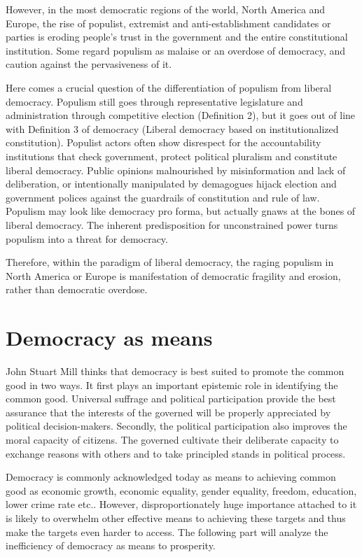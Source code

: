 \documentclass{scrartcl}
\begin{document}
However, in the most democratic regions of the world, North America
and Europe, the rise of populist, extremist and anti-establishment
candidates or parties is eroding people's trust in the government
and the entire constitutional institution. Some regard populism as
malaise or an overdose of democracy, and caution against the pervasiveness
of it.

Here comes a crucial question of the differentiation of populism from
liberal democracy. Populism still goes through representative legislature
and administration through competitive election (Definition 2), but
it goes out of line with Definition 3 of democracy (Liberal democracy
based on institutionalized constitution). Populist actors often show
disrespect for the accountability institutions that check government,
protect political pluralism and constitute liberal democracy. Public
opinions malnourished by misinformation and lack of deliberation,
or intentionally manipulated by demagogues hijack election and government
polices against the guardrails of constitution and rule of law. Populism
may look like democracy pro forma, but actually gnaws at the bones
of liberal democracy. The inherent predisposition for unconstrained
power turns populism into a threat for democracy.

Therefore, within the paradigm of liberal democracy, the raging populism
in North America or Europe is manifestation of democratic fragility
and erosion, rather than democratic overdose. 

\section{Democracy as means}

John Stuart Mill thinks that democracy is best suited to promote the
common good in two ways. It first plays an important epistemic role
in identifying the common good. Universal suffrage and political participation
provide the best assurance that the interests of the governed will
be properly appreciated by political decision-makers. Secondly, the
political participation also improves the moral capacity of citizens.
The governed cultivate their deliberate capacity to exchange reasons
with others and to take principled stands in political process.\autocite{Mill_2010} 

Democracy is commonly acknowledged today as means to achieving common
good as economic growth, economic equality, gender equality, freedom,
education, lower crime rate etc.. However, disproportionately huge
importance attached to it is likely to overwhelm other effective means
to achieving these targets and thus make the targets even harder to
access. The following part will analyze the inefficiency of democracy
as means to prosperity. 
\end{document}
